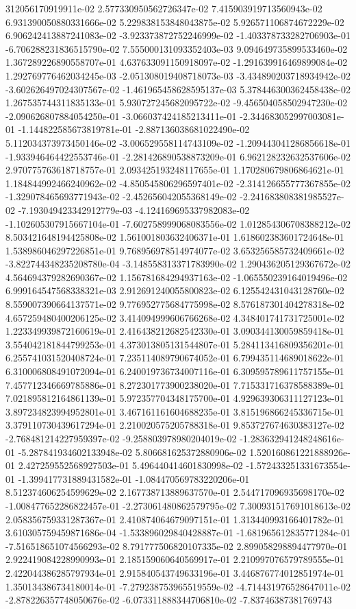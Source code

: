 312056170919911e-02	2.577330950562726347e-02	7.415903919713560943e-02	6.931390050880331666e-02	5.229838153848043875e-02	5.926571106874672229e-02	6.906242413887241083e-02	-3.923373872752246999e-02	-1.403378733282706903e-01	-6.706288231836515790e-02	7.555000131093352403e-03	9.094649735899533460e-02	1.367289226890558707e-01	4.637633091150918097e-02	-1.291639916469899084e-02	1.292769776462034245e-03	-2.051308019408718073e-03	-3.434890203718934942e-02	-3.602626497024307567e-02	-1.461965458628595137e-03	5.378446300362458438e-02	1.267535744311835133e-01	5.930727245682095722e-02	-9.456504058502947230e-02	-2.090626807884054250e-01	-3.066037424185213411e-01	-2.344683052997003081e-01	-1.144822585673819781e-01	-2.887136038681022490e-02	5.112034373973450146e-02	-3.006529558114743109e-02	-1.209443041286856618e-01	-1.933946464422553746e-01	-2.281426890538873209e-01	6.962128232632537606e-02	2.970775763618718757e-01	2.093425193248117655e-01	1.170280679806864621e-01	1.184844992466240962e-02	-4.850545806296597401e-02	-2.314126655777367855e-02	-1.329078465693771943e-02	-2.452656042055368149e-02	-2.241683808381985527e-02	-7.193049423342912779e-03	-4.124169695337982083e-02	-1.102605307915667104e-01	-7.602758999068083556e-02	1.012854306708388212e-02	8.503421648194425808e-02	1.561001803632406371e-01	1.618602383601724648e-01	1.538986046297226851e-01	9.768956978514974077e-02	3.653256585732409661e-02	-3.822744348235208780e-04	-3.148558313371783990e-02	1.290436205129367672e-02	4.564694379282690367e-02	1.156781684294937163e-02	-1.065550239164019496e-02	6.999164547568338321e-03	2.912691240055800823e-02	6.125542431043128760e-02	8.559007390664137571e-02	9.776952775684775998e-02	8.576187301404278318e-02	4.657259480400206125e-02	3.414094999606766268e-02	4.348401741731725001e-02	1.223349939872160619e-01	2.416438212682542330e-01	3.090344130059859418e-01	3.554042181844799253e-01	4.373013805131544807e-01	5.284113416809356201e-01	6.255741031520408724e-01	7.235114089790674052e-01	6.799435114689018622e-01	6.310006808491072094e-01	6.240019736734007116e-01	6.309595789611757155e-01	7.457712346669785886e-01	8.272301773900238020e-01	7.715331716378588389e-01	7.021895812164861139e-01	5.972357704348175700e-01	4.929639306311127123e-01	3.897234823994952801e-01	3.467161161604688235e-01	3.815196866245336715e-01	3.379110730439617294e-01	2.210020575205788318e-01	9.853727674630383127e-02	-2.768481214227959397e-02	-9.258803978980204019e-02	-1.283632941248248616e-01	-5.287841934602133948e-02	5.806681625372880906e-02	1.520160861221888926e-01	2.427259552568927503e-01	5.496440414601830998e-02	-1.572433251331673554e-01	-1.399417731889431582e-01	-1.084470569783220206e-01	8.512374606254599629e-02	2.167738713889637570e-01	2.544717096935698170e-02	-1.008477652286822457e-01	-2.273061480862579795e-02	7.300931517691018613e-02	2.058356759331287367e-01	2.410874064679097151e-01	1.313440993166401782e-01	3.610305759459871686e-04	-1.533896029840428887e-01	-1.681965612835771284e-01	-7.516518651074566293e-02	8.791777506820107335e-02	2.899058298894477970e-01	2.922419084228990993e-01	2.185159060640569917e-01	2.210997076579789555e-01	2.422044386285797934e-01	2.915840543749633196e-01	3.446876774012851974e-01	1.350134386734180014e-01	-7.279238753965519559e-02	-4.714431976528647011e-02	-2.878226357748050676e-02	-6.073311888344706810e-02	-7.83746387381769743